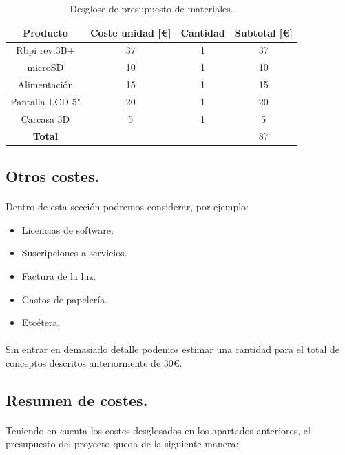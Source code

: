 \begin{table}[hbt]
	\label{t:materialescostes}
	\centering
	\begin{tabular}{|c|c|c|c|}
		\hline
		\textbf{Producto} & \textbf{Coste unidad [\euro]} & \textbf{Cantidad} & \textbf{Subtotal [\euro]} \\
		\hline
		Rbpi rev.3B+ & 37 & 1 & 37 \\
		\hline
		microSD & 10 & 1 & 10 \\
		\hline
        Alimentación & 15 & 1 & 15 \\
		\hline
        Pantalla LCD 5" & 20 & 1 & 20 \\
		\hline
        Carcasa 3D & 5 & 1 & 5 \\
		\hline
		\textbf{Total} & & & 87 \\
		\hline
	\end{tabular}
    \caption{Desglose de presupuesto de materiales.}
\end{table}

\subsection{Otros costes.}

\paragraph{}Dentro de esta sección podremos considerar, por ejemplo:

\begin{itemize}
    \item Licencias de software.
    \item Suscripciones a servicios.
    \item Factura de la luz.
    \item Gastos de papelería.
    \item Etcétera.
\end{itemize}

\paragraph{}Sin entrar en demasiado detalle podemos estimar una cantidad
para el total de conceptos descritos anteriormente de 30\euro.

\subsection{Resumen de costes.}

\paragraph{}Teniendo en cuenta los costes desglosados en los apartados anteriores, el
presupuesto del proyecto queda de la siguiente manera:

